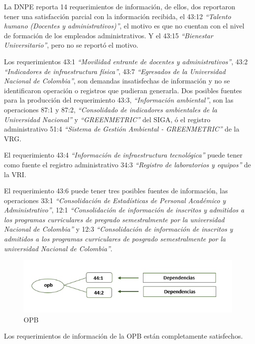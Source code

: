 \documentclass[
]{book}
\begin{document}
La DNPE reporta 14 requerimientos de información, de ellos, dos reportaron tener una
satisfacción parcial con la información recibida, el 43:12 \emph{``Talento humano (Docentes y administrativos)''}, el motivo es que no cuentan con el nivel de formación de los empleados
administrativos. Y el 43:15 \emph{``Bienestar Universitario''}, pero no se reportó el motivo.

Los requerimientos 43:1 \emph{``Movilidad entrante de docentes y administrativos''}, 43:2 \emph{``Indicadores de infraestructura física''}, 43:7 \emph{``Egresados de la Universidad Nacional de Colombia''}, son demandas
insatisfechas de información y no se identificaron operación o registros que pudieran generarla.
Dos posibles fuentes para la producción del requerimiento 43:3, \emph{``Información ambiental''}, son las
operaciones 87:1 y 87:2, \emph{``Consolidado de indicadores ambientales de la Universidad Nacional''} y
\emph{``GREENMETRIC''} del SIGA, ó el registro administrativo 51:4 \emph{``Sistema de Gestión Ambiental - GREENMETRIC''} de la VRG.

El requerimiento 43:4 \emph{``Información de infraestructura tecnológica''} puede tener como fuente el
registro administrativo 34:3 \emph{``Registro de laboratorios y equipos''} de la VRI.

El requerimiento 43:6 puede tener tres posibles fuentes de información, las operaciones 33:1
\emph{``Consolidación de Estadísticas de Personal Académico y Administrativo''}, 12:1 \emph{``Consolidación de información de inscritos y admitidos a los programas curriculares de pregrado semestralmente por la universidad Nacional de Colombia''} y 12:3 \emph{``Consolidación de información de inscritos y admitidos a los programas curriculares de posgrado semestralmente por la universidad Nacional de Colombia''}.

\begin{figure}

{\centering \includegraphics[width=0.75\linewidth]{Imagenes/ima10} 

}

\caption{OPB}\label{fig:unnamed-chunk-38}
\end{figure}

Los requerimientos de información de la OPB están completamente satisfechos.
\end{document}
